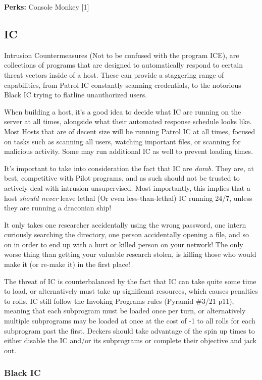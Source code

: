 \begin{multicols}{2}
	\textbf{Perks:}
	Console Monkey [1]
				
	\subsection{IC}
	
	Intrusion Countermeasures (Not to be confused with the program ICE), are collections of programs that are designed to automatically respond to certain threat vectors inside of a host. These can provide a staggering range of capabilities, from Patrol IC constantly scanning credentials, to the notorious Black IC trying to flatline unauthorized users.
	
	When building a host, it's a good idea to decide what IC are running on the server at all times, alongside what their automated response schedule looks like. Most Hosts that are of decent size will be running Patrol IC at all times, focused on tasks such as scanning all users, watching important files, or scanning for malicious activity. Some may run additional IC as well to prevent loading times.
	
	It's important to take into consideration the fact that IC are \textit{dumb.} They are, at best, competitive with Pilot programs, and as such should not be trusted to actively deal with intrusion unsupervised. Most importantly, this implies that a host \textit{should never} leave lethal (Or even less-than-lethal) IC running 24/7, unless they are running a draconian ship! 
	
	It only takes one researcher accidentally using the wrong password, one intern curiously searching the directory, one person accidentally opening a file, and so on in order to end up with a hurt or killed person on your network! The only worse thing than getting your valuable research stolen, is killing those who would make it (or re-make it) in the first place!
	
	The threat of IC is counterbalanced by the fact that IC can take quite some time to load, or alternatively must take up significant resources, which causes penalties to rolls. IC still follow the Invoking Programs rules (Pyramid \#3/21 p11), meaning that each subprogram must be loaded once per turn, or alternatively multiple subprograms may be loaded at once at the cost of -1 to all rolls for each subprogram past the first. Deckers should take advantage of the spin up times to either disable the IC and/or its subprograms or complete their objective and jack out.
	
	\subsubsection{Black IC}
	

\end{multicols}
